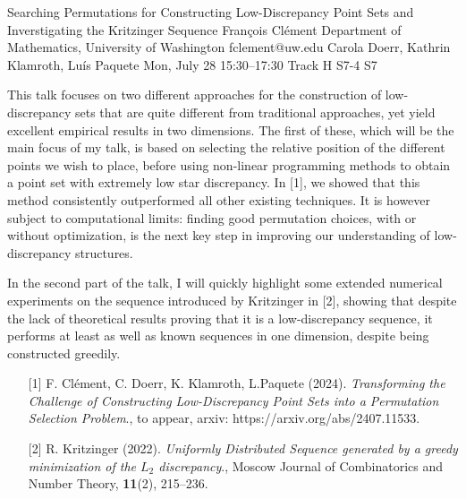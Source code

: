 \begin{talk}
  {Searching Permutations for Constructing Low-Discrepancy Point Sets and Inverstigating the Kritzinger Sequence}%
  {Fran\c{c}ois Cl\'{e}ment}%
  {Department of Mathematics, University of Washington}%
  {fclement@uw.edu}%
  {Carola Doerr, Kathrin Klamroth, Luís Paquete}%
  {}%
  {Mon, July 28 15:30–17:30 Track H}%
  {S7-4}%
  {S7}%
  
				
			
This talk focuses on two different approaches for the construction of low-discrepancy sets that are quite different from traditional approaches, yet yield excellent empirical results in two dimensions. The first of these, which will be the main focus of my talk, is based on selecting the relative position of the different points we wish to place, before using non-linear programming methods to obtain a point set with extremely low star discrepancy. In [1], we showed that this method consistently outperformed all other existing techniques. It is however subject to computational limits: finding good permutation choices, with or without optimization, is the next key step in improving our understanding of low-discrepancy structures.

In the second part of the talk, I will quickly highlight some extended numerical experiments on the sequence introduced by Kritzinger in [2], showing that despite the lack of theoretical results proving that it is a low-discrepancy sequence, it performs at least as well as known sequences in one dimension, despite being constructed greedily. 

\medskip

\begin{enumerate}
	\item[{[1]}] F. Clément, C. Doerr, K. Klamroth, L.Paquete (2024). {\it Transforming the Challenge of Constructing Low-Discrepancy Point Sets into a Permutation Selection Problem}., to appear, arxiv: https://arxiv.org/abs/2407.11533.
	\item[{[2]}] R. Kritzinger (2022).  {\it Uniformly Distributed Sequence generated by a greedy minimization of the $L_2$ discrepancy}., Moscow Journal of Combinatorics and Number Theory, \textbf{11}(2), 215--236.
\end{enumerate}

\end{talk}

